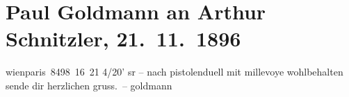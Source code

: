 

         
         \renewcommand{\erwaehntePersonen}{Personen: Paul Goldmann, Lucien Millevoye}
         \renewcommand{\erwaehnteOrte}{Orte: Paris, Wien}
         \renewcommand{\erwaehnteWerke}{}
               \section[Paul Goldmann an Arthur Schnitzler, 21. 11. 1896]{ Paul Goldmann an Arthur Schnitzler, 21. 11. 1896}\nopagebreak{}\rehead{ }\begin{ledgroupsized}[t]{13cm}\normalsize\beginnumbering{} \toendnotes[C]{\smallbreak\pagebreak[2]} 
\pstart
           \centering{}{\pb}wienparis 8498 16 21{ }4/20’ sr –\pend
           \pstart
           nach pistolenduell mit millevoye
               wohlbehalten\pend
           \pstart sende dir herzlichen gruss. – \spacefill\mbox{goldmann}\pend{}
         
         \endnumbering{}\end{ledgroupsized}  \newcommand{\dateiname}{L02689}\newcommand{\titel}{Paul Goldmann an Arthur Schnitzler, 21. 11. 1896}\newcommand{\editorInnen}{Martin Anton Müller und Laura Untner}
      